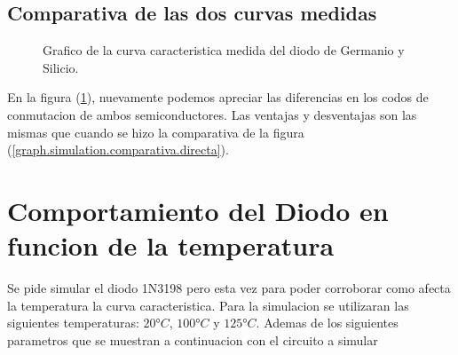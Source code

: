 \documentclass[chaptersright]{informeutn}
\begin{document}
      \section{Comparativa de las dos curvas medidas}
      \begin{figure}[!ht]
        \centering
        \caption{Grafico de la curva caracteristica medida del diodo de Germanio y Silicio.}
        \label{graph.comparativa.medida}
      \end{figure}

      En la figura (\ref{graph.comparativa.medida}), nuevamente podemos apreciar las diferencias en los codos de
      conmutacion de ambos semiconductores. Las ventajas y desventajas son las mismas que cuando se hizo la comparativa
      de la figura (\ref{graph.simulation.comparativa.directa}).

    \chapter{Comportamiento del Diodo en funcion de la temperatura}
      Se pide simular el diodo 1N3198 pero esta vez para poder corroborar como afecta la temperatura la curva
      caracteristica. Para la simulacion se utilizaran las siguientes temperaturas: $20°C$, $100°C$ y $125°C$. Ademas
      de los siguientes parametros que se muestran a continuacion con el circuito a simular
\end{document}
